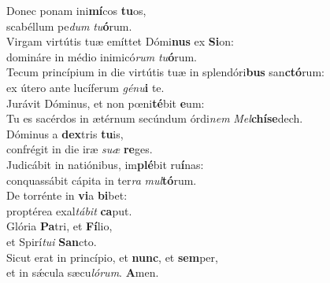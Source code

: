 \evenverse Donec ponam ini\textbf{mí}cos \textbf{tu}os,~\*\\
\evenverse scabéllum pe\textit{dum} \textit{tu}\textbf{ó}rum.\\
\oddverse Virgam virtútis tuæ emíttet Dómi\textbf{nus} ex \textbf{Si}on:~\*\\
\oddverse domináre in médio inimicó\textit{rum} \textit{tu}\textbf{ó}rum.\\
\evenverse Tecum princípium in die virtútis tuæ in splendóri\textbf{bus} san\textbf{ctó}rum:~\*\\
\evenverse ex útero ante lucíferum \textit{gé}\textit{nu}\textbf{i} te.\\
\oddverse Jurávit Dóminus, et non pœni\textbf{té}bit \textbf{e}um:~\*\\
\oddverse Tu es sacérdos in ætérnum secúndum órdi\textit{nem} \textit{Mel}\textbf{chí}\textbf{se}dech.\\
\evenverse Dóminus a \textbf{dex}tris \textbf{tu}is,~\*\\
\evenverse confrégit in die iræ \textit{su}\textit{æ} \textbf{re}ges.\\
\oddverse Judicábit in natiónibus, im\textbf{plé}bit ru\textbf{í}nas:~\*\\
\oddverse conquassábit cápita in ter\textit{ra} \textit{mul}\textbf{tó}rum.\\
\evenverse De torrénte in \textbf{vi}a \textbf{bi}bet:~\*\\
\evenverse proptérea exal\textit{tá}\textit{bit} \textbf{ca}put.\\
\oddverse Glória \textbf{Pa}tri, et \textbf{Fí}lio,~\*\\
\oddverse et Spirí\textit{tu}\textit{i} \textbf{San}cto.\\
\evenverse Sicut erat in princípio, et \textbf{nunc}, et \textbf{sem}per,~\*\\
\evenverse et in sǽcula sæcu\textit{ló}\textit{rum}. \textbf{A}men.\\
